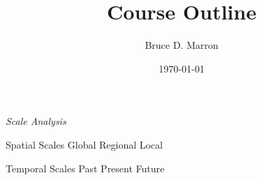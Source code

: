 \documentclass[12pt, letterpaper]{article}
\title{\vspace{-15mm}\fontsize{14pt}{10pt}
                    \selectfont \textbf{Course Outline}   %
                    \vspace{-7mm}
      }
\author{
     \normalsize Bruce D. Marron \\                     %
     \vspace{-5mm}
}
\date{\normalsize \today}
\begin{document}
\begin{singlespacing}
\end{singlespacing}
\thispagestyle{fancy}                           %


\large
\begin{flushleft}
\textit{Scale Analysis}
\end{flushleft}

\normalsize
\begin{outline}[enumerate]
\1 Spatial Scales
\2 Global
\2 Regional
\2 Local

\1 Temporal Scales
\2 Past
\2 Present
\2 Future
\end{outline}





\clearpage 
\renewcommand{\thepage}{}
\printbibliography
\end{document}
